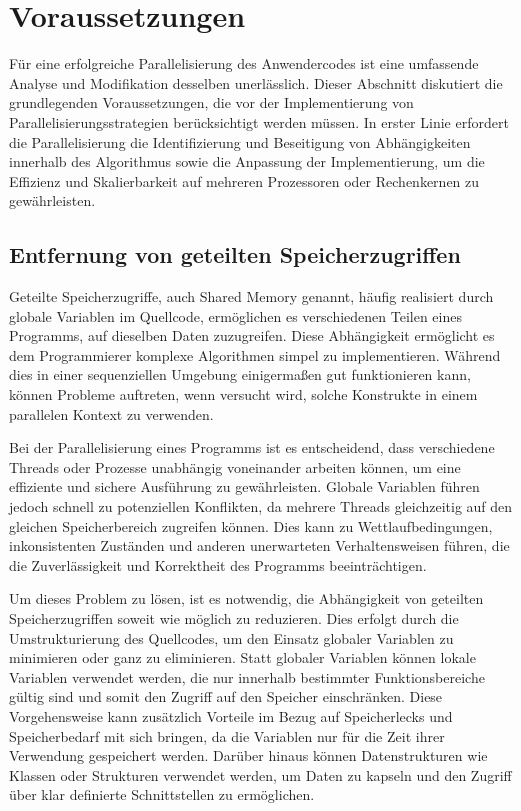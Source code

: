 \section{Voraussetzungen}
\label{sec:Voraussetzungen_Parallelisierung}
Für eine erfolgreiche Parallelisierung des Anwendercodes ist eine umfassende Analyse und Modifikation desselben unerlässlich. Dieser Abschnitt diskutiert die grundlegenden Voraussetzungen, die vor der Implementierung von Parallelisierungsstrategien berücksichtigt werden müssen. In erster Linie erfordert die Parallelisierung die Identifizierung und Beseitigung von Abhängigkeiten innerhalb des Algorithmus sowie die Anpassung der Implementierung, um die Effizienz und Skalierbarkeit auf mehreren Prozessoren oder Rechenkernen zu gewährleisten.

\subsection{Entfernung von geteilten Speicherzugriffen}
\label{sec:Entfernung_geteilte_Speicherzugriffe}
Geteilte Speicherzugriffe, auch Shared Memory genannt, häufig realisiert durch globale Variablen im Quellcode, ermöglichen es verschiedenen Teilen eines Programms, auf dieselben Daten zuzugreifen. Diese Abhängigkeit ermöglicht es dem Programmierer komplexe Algorithmen simpel zu implementieren. Während dies in einer sequenziellen Umgebung einigermaßen gut funktionieren kann, können Probleme auftreten, wenn versucht wird, solche Konstrukte in einem parallelen Kontext zu verwenden.

Bei der Parallelisierung eines Programms ist es entscheidend, dass verschiedene Threads oder Prozesse unabhängig voneinander arbeiten können, um eine effiziente und sichere Ausführung zu gewährleisten. Globale Variablen führen jedoch schnell zu potenziellen Konflikten, da mehrere Threads gleichzeitig auf den gleichen Speicherbereich zugreifen können. Dies kann zu Wettlaufbedingungen, inkonsistenten Zuständen und anderen unerwarteten Verhaltensweisen führen, die die Zuverlässigkeit und Korrektheit des Programms beeinträchtigen.

Um dieses Problem zu lösen, ist es notwendig, die Abhängigkeit von geteilten Speicherzugriffen soweit wie möglich zu reduzieren. Dies erfolgt durch die Umstrukturierung des Quellcodes, um den Einsatz globaler Variablen zu minimieren oder ganz zu eliminieren. Statt globaler Variablen können lokale Variablen verwendet werden, die nur innerhalb bestimmter Funktionsbereiche gültig sind und somit den Zugriff auf den Speicher einschränken. Diese Vorgehensweise kann zusätzlich Vorteile im Bezug auf Speicherlecks und Speicherbedarf mit sich bringen, da die Variablen nur für die Zeit ihrer Verwendung gespeichert werden. Darüber hinaus können Datenstrukturen wie Klassen oder Strukturen verwendet werden, um Daten zu kapseln und den Zugriff über klar definierte Schnittstellen zu ermöglichen.


